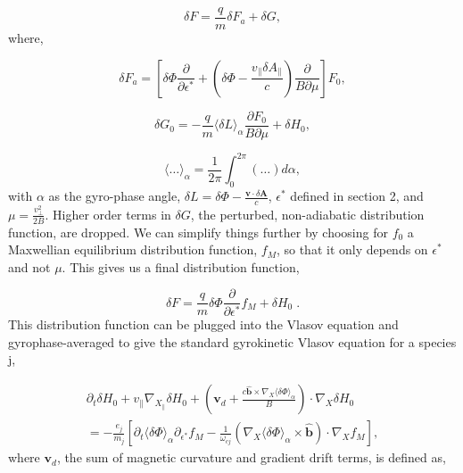 \documentclass[12pt]{article}
\numberwithin{equation}{section}
\begin{document}
   \begin{equation}
      \delta F = \frac{q}{m}\delta F_a + \delta G,
   \end{equation}
where,
    
   \begin{equation}
      \delta F_a = [\delta\Phi\frac{\partial}{\partial\epsilon^*} + (\delta\Phi - \frac{v_\parallel \delta A_\parallel}
                   {c})\frac{\partial}{B\partial\mu}]F_0, 
   \end{equation}
   
   \begin{equation}
      \delta G_0 = -\frac{q}{m}\langle\delta L\rangle_\alpha\frac{\partial F_0}{B\partial\mu} + \delta H_0,
   \end{equation}

   \begin{equation}
      \langle\ldots\rangle_\alpha = \frac{1}{2\pi}\int_{0}^{2\pi}(\ldots)d\alpha,
   \end{equation}
with $\alpha$ as the gyro-phase angle, $\delta L = \delta\Phi - \frac{\bm{v}\cdot\delta\bm{A}}{c}$, $\epsilon^*$ defined in section 2, and $\mu = \frac{v_\perp^2}{2B}$.
Higher order terms in $\delta G$, the perturbed, non-adiabatic distribution function, are dropped. We can simplify things further by choosing for $f_0$ a Maxwellian
equilibrium distribution function, $f_M$, so that it only depends on $\epsilon^*$ and not $\mu$. This gives us a final distribution function,

   \begin{equation}
      \delta F = \frac{q}{m}\delta\Phi\frac{\partial}{\partial\epsilon^*}f_M + \delta H_0\;.
   \end{equation}
This distribution function can be plugged into the Vlasov equation and gyrophase-averaged to give the standard gyrokinetic Vlasov
equation for a species j\cite{FriemanChen},

   \begin{equation}
   \begin{aligned}
      \partial_t\delta H_0 + v_\parallel\nabla_{X_\parallel}\delta H_0 +
      (\bm{v}_d + \frac{c\bm{\hat{b}}\times\nabla_X\langle\delta\Phi\rangle_\alpha}{B})\cdot\nabla_X\delta H_0 \\
      = 
      -\frac{e_j}{m_j}[\partial_t\langle\delta\Phi\rangle_\alpha\partial_{\epsilon^*} f_M
      -\frac{1}{\omega_{cj}}(\nabla_X\langle\delta\Phi\rangle_\alpha\times\bm{\hat{b}})\cdot\nabla_X f_M],
   \end{aligned}
   \end{equation}
where $\bm{v}_d$, the sum of magnetic curvature and gradient drift terms, is defined as,
\end{document}
